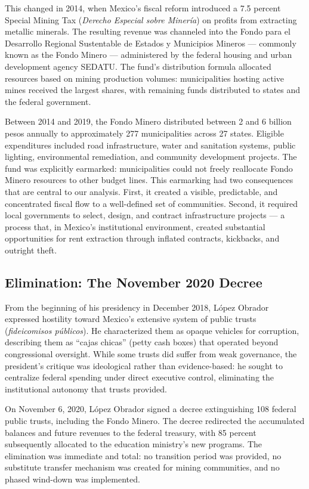 \documentclass[12pt]{article}
\begin{document}
This changed in 2014, when Mexico's fiscal reform introduced a 7.5 percent Special Mining Tax (\textit{Derecho Especial sobre Miner\'{i}a}) on profits from extracting metallic minerals. The resulting revenue was channeled into the Fondo para el Desarrollo Regional Sustentable de Estados y Municipios Mineros --- commonly known as the Fondo Minero --- administered by the federal housing and urban development agency SEDATU. The fund's distribution formula allocated resources based on mining production volumes: municipalities hosting active mines received the largest shares, with remaining funds distributed to states and the federal government.

Between 2014 and 2019, the Fondo Minero distributed between 2 and 6 billion pesos annually to approximately 277 municipalities across 27 states. Eligible expenditures included road infrastructure, water and sanitation systems, public lighting, environmental remediation, and community development projects. The fund was explicitly earmarked: municipalities could not freely reallocate Fondo Minero resources to other budget lines. This earmarking had two consequences that are central to our analysis. First, it created a visible, predictable, and concentrated fiscal flow to a well-defined set of communities. Second, it required local governments to select, design, and contract infrastructure projects --- a process that, in Mexico's institutional environment, created substantial opportunities for rent extraction through inflated contracts, kickbacks, and outright theft.

\subsection{Elimination: The November 2020 Decree}

From the beginning of his presidency in December 2018, L\'{o}pez Obrador expressed hostility toward Mexico's extensive system of public trusts (\textit{fideicomisos p\'{u}blicos}). He characterized them as opaque vehicles for corruption, describing them as ``cajas chicas'' (petty cash boxes) that operated beyond congressional oversight. While some trusts did suffer from weak governance, the president's critique was ideological rather than evidence-based: he sought to centralize federal spending under direct executive control, eliminating the institutional autonomy that trusts provided.

On November 6, 2020, L\'{o}pez Obrador signed a decree extinguishing 108 federal public trusts, including the Fondo Minero. The decree redirected the accumulated balances and future revenues to the federal treasury, with 85 percent subsequently allocated to the education ministry's new programs. The elimination was immediate and total: no transition period was provided, no substitute transfer mechanism was created for mining communities, and no phased wind-down was implemented.
\end{document}
